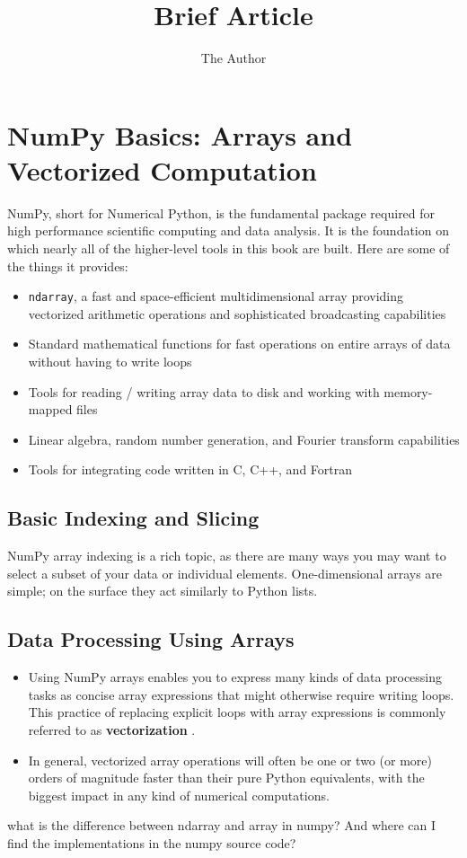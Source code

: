\documentclass[11pt]{article} %
\title{Brief Article}
\author{The Author}
\begin{document}
\section{NumPy Basics: Arrays and Vectorized Computation}

NumPy, short for Numerical Python, is the fundamental package required for high
performance scientific computing and data analysis. It is the foundation on which
nearly all of the higher-level tools in this book are built. Here are some of the things it
provides:

\begin{itemize}
\item \texttt{ndarray}, a fast and space-efficient multidimensional array providing vectorized
arithmetic operations and sophisticated broadcasting capabilities
\item Standard mathematical functions for fast operations on entire arrays of data
without having to write loops
\item Tools for reading / writing array data to disk and working with memory-mapped
files
\item Linear algebra, random number generation, and Fourier transform capabilities
\item Tools for integrating code written in C, C++, and Fortran
\end{itemize}

\newpage

\subsection{Basic Indexing and Slicing}
NumPy array indexing is a rich topic, as there are many ways you may want to select
a subset of your data or individual elements. One-dimensional arrays are simple; on
the surface they act similarly to Python lists.
\subsection{Data Processing Using Arrays}

\begin{itemize}
\item Using NumPy arrays enables you to express many kinds of data processing tasks as
concise array expressions that might otherwise require writing loops. This practice of
replacing explicit loops with array expressions is commonly referred to as \textbf{vectorization
}.

\item In general, vectorized array operations will often be one or two (or more) orders
of magnitude faster than their pure Python equivalents, with the biggest impact in any
kind of numerical computations.
\end{itemize}
\newpage
what is the difference between ndarray and array in numpy? And where can I find the implementations in the numpy source code?
\end{document}
